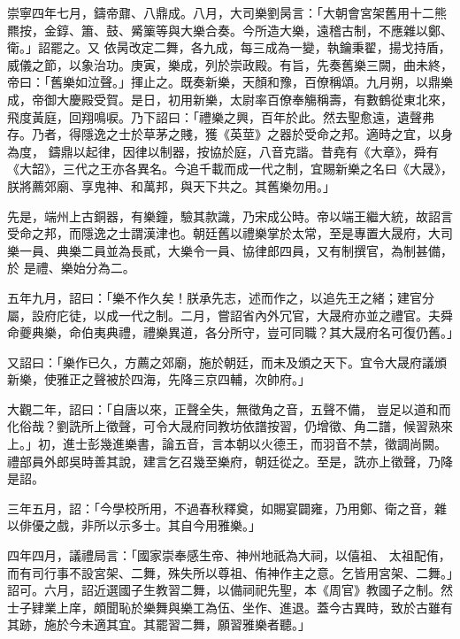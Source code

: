 
\begin{pinyinscope}

 崇寧四年七月，鑄帝鼐、八鼎成。八月，大司樂劉昺言：「大朝會宮架舊用十二熊羆按，金錞、簫、鼓、觱篥等與大樂合奏。今所造大樂，遠稽古制，不應雜以鄭、衛。」詔罷之。又
 依昺改定二舞，各九成，每三成為一變，執鑰秉翟，揚戈持盾，威儀之節，以象治功。庚寅，樂成，列於崇政殿。有旨，先奏舊樂三闕，曲未終，帝曰：「舊樂如泣聲。」揮止之。既奏新樂，天顏和豫，百僚稱頌。九月朔，以鼎樂成，帝御大慶殿受賀。是日，初用新樂，太尉率百僚奉觴稱壽，有數鶴從東北來，飛度黃庭，回翔鳴唳。乃下詔曰：「禮樂之興，百年於此。然去聖愈遠，遺聲弗存。乃者，得隱逸之士於草茅之賤，獲《英莖》之器於受命之邦。適時之宜，以身為度，
 鑄鼎以起律，因律以制器，按協於庭，八音克諧。昔堯有《大章》，舜有《大韶》，三代之王亦各異名。今追千載而成一代之制，宜賜新樂之名曰《大晟》，朕將薦郊廟、享鬼神、和萬邦，與天下共之。其舊樂勿用。」



 先是，端州上古銅器，有樂鐘，驗其款識，乃宋成公時。帝以端王繼大統，故詔言受命之邦，而隱逸之士謂漢津也。朝廷舊以禮樂掌於太常，至是專置大晟府，大司樂一員、典樂二員並為長貳，大樂令一員、協律郎四員，又有制撰官，為制甚備，於
 是禮、樂始分為二。



 五年九月，詔曰：「樂不作久矣！朕承先志，述而作之，以追先王之緒；建官分屬，設府庀徒，以成一代之制。二月，嘗詔省內外冗官，大晟府亦並之禮官。夫舜命夔典樂，命伯夷典禮，禮樂異道，各分所守，豈可同職？其大晟府名可復仍舊。」



 又詔曰：「樂作已久，方薦之郊廟，施於朝廷，而未及頒之天下。宜令大晟府議頒新樂，使雅正之聲被於四海，先降三京四輔，次帥府。」



 大觀二年，詔曰：「自唐以來，正聲全失，無徵角之音，五聲不備，
 豈足以道和而化俗哉？劉詵所上徵聲，可令大晟府同教坊依譜按習，仍增徵、角二譜，候習熟來上。」初，進士彭幾進樂書，論五音，言本朝以火德王，而羽音不禁，徵調尚闕。禮部員外郎吳時善其說，建言乞召幾至樂府，朝廷從之。至是，詵亦上徵聲，乃降是詔。



 三年五月，詔：「今學校所用，不過春秋釋奠，如賜宴闢雍，乃用鄭、衛之音，雜以俳優之戲，非所以示多士。其自今用雅樂。」



 四年四月，議禮局言：「國家崇奉感生帝、神州地祇為大祠，以僖祖、
 太祖配侑，而有司行事不設宮架、二舞，殊失所以尊祖、侑神作主之意。乞皆用宮架、二舞。」詔可。六月，詔近選國子生教習二舞，以備祠祀先聖，本《周官》教國子之制。然士子肄業上庠，頗聞恥於樂舞與樂工為伍、坐作、進退。蓋今古異時，致於古雖有其跡，施於今未適其宜。其罷習二舞，願習雅樂者聽。」




\end{pinyinscope}
